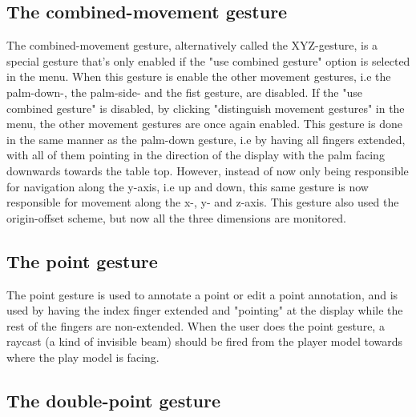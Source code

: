 \subsection{The combined-movement gesture}
The combined-movement gesture, alternatively called the XYZ-gesture, is a special gesture that's only enabled if the "use combined gesture" option is selected in the menu.
When this gesture is enable the other movement gestures, i.e the palm-down-, the palm-side- and the fist gesture, are disabled. If the "use combined gesture" is disabled, 
by clicking "distinguish movement gestures" in the menu, the other movement gestures are once again enabled. This gesture is done in the same manner as the palm-down gesture, 
i.e by having all fingers extended, with all of them pointing in the direction of the display with the palm facing downwards towards the table top.
However, instead of now only being responsible for navigation along the y-axis, i.e up and down, this same gesture is now responsible for movement along the x-, y- and z-axis.
This gesture also used the origin-offset scheme, but now all the three dimensions are monitored. 

\subsection{The point gesture}
The point gesture is used to annotate a point or edit a point annotation, and is used by having the index finger extended and "pointing" at the display while the 
rest of the fingers are non-extended. When the user does the point gesture, a raycast (a kind of invisible beam) should be fired from the 
player model towards where the play model is facing. 

\subsection{The double-point gesture}